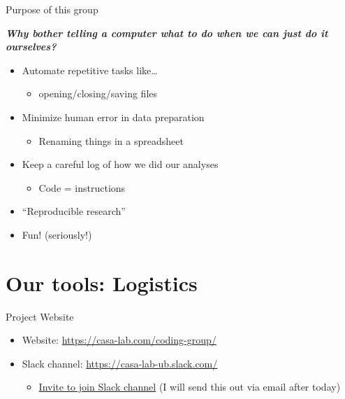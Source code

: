 \documentclass[
  ignorenonframetext,
]{beamer}
\providecommand{\tightlist}{%
  \setlength{\itemsep}{0pt}\setlength{\parskip}{0pt}}
\begin{document}
\begin{frame}{Purpose of this group}
\protect\hypertarget{purpose-of-this-group-3}{}

\textbf{\emph{Why bother telling a computer what to do when we can just
do it ourselves?}}

\begin{itemize}
\tightlist
\item
  Automate repetitive tasks like\ldots{}

  \begin{itemize}
  \tightlist
  \item
    opening/closing/saving files
  \end{itemize}
\item
  Minimize human error in data preparation

  \begin{itemize}
  \tightlist
  \item
    Renaming things in a spreadsheet
  \end{itemize}
\item
  Keep a careful log of how we did our analyses

  \begin{itemize}
  \tightlist
  \item
    Code = instructions
  \end{itemize}
\item
  ``Reproducible research''
\item
  Fun! (seriously!)
\end{itemize}

\end{frame}

\hypertarget{our-tools-logistics}{%
\section{Our tools: Logistics}\label{our-tools-logistics}}

\begin{frame}{Project Website}
\protect\hypertarget{project-website}{}

\begin{itemize}
\tightlist
\item
  Website: \url{https://casa-lab.com/coding-group/}
\item
  Slack channel: \url{https://casa-lab-ub.slack.com/}

  \begin{itemize}
  \tightlist
  \item
    \href{https://join.slack.com/t/casa-lab-ub/shared_invite/enQtOTU2OTcwMzg3MDQzLTk4NmM0MjhlYTAyY2JkODhkNDZkYmE5MTc3M2VkZTEyNDg1YjhmMmM0ZmEwYjlkYmI5NTMyZjYxYjk5MDNmMWQ}{Invite
    to join Slack channel} (I will send this out via email after today)
  \end{itemize}
\end{itemize}

\end{frame}
\end{document}
